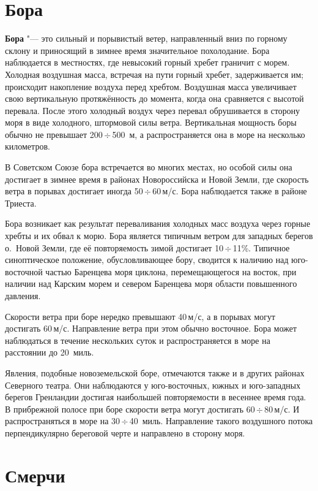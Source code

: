 \documentclass[a4paper, 12pt, twoside, draft, book, russian, fittopage, cyremdash, openright]{ncc}
\newcommand{\mps}{\,м/с\xspace}
\newcommand{\otdo}{\,\ensuremath{\div}\,}
\begin{document}
\section{Бора}
\label{sec:bora_wind}

\textbf{Бора} "--- это сильный и порывистый ветер, направленный вниз
по горному склону и приносящий в зимнее время значительное
похолодание. Бора наблюдается в местностях, где невысокий горный
хребет граничит с морем. Холодная воздушная масса, встречая на пути
горный хребет, задерживается им; происходит накопление воздуха перед
хребтом. Воздушная масса увеличивает свою вертикальную протяжённость
до момента, когда она сравняется с высотой перевала. После этого
холодный воздух через перевал обрушивается в сторону моря в виде
холодного, штормовой силы ветра. Вертикальная мощность боры обычно не
превышает 200\otdo500~м, а распространяется она в море на несколько
километров.

В Советском Союзе бора встречается во многих местах, но особой силы
она достигает в зимнее время в районах Новороссийска и Новой Земли,
где скорость ветра в порывах достигает иногда 50\otdo60\mps. Бора
наблюдается также в районе Триеста.

Бора возникает как результат переваливания холодных масс воздуха через
горные хребты и их обвал к морю. Бора является типичным ветром для
западных берегов о.~Новой Земли, где её повторяемость зимой достигает
10\otdo11\%. Типичное синоптическое положение, обусловливающее бору,
сводится к наличию над юго-восточной частью Баренцева моря циклона,
перемещающегося на восток, при наличии над Карским морем и севером
Баренцева моря области повышенного давления.

Скорости ветра при боре нередко превышают 40\mps, а в порывах могут
достигать 60\mps.  Направление ветра при этом обычно восточное. Бора
может наблюдаться в течение нескольких суток и распространяется в море
на расстоянии до 20~миль.

Явления, подобные новоземельской боре, отмечаются также и в других
районах Северного театра. Они наблюдаются у юго-восточных, южных и
юго-западных берегов Гренландии достигая наибольшей повторяемости в
весеннее время года. В прибрежной полосе при боре скорости ветра могут
достигать 60\otdo80\mps. И распространяться в море на
30\otdo40~миль. Направление такого воздушного потока перпендикулярно
береговой черте и направлено в сторону моря.

\section{Смерчи}
\label{sec:tornados}
\end{document}
